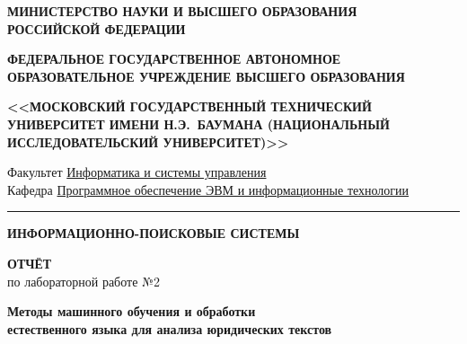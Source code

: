 \documentclass[12pt, a4paper]{report}
\begin{document}
\setcounter{chapter}{0}

\begin{titlepage}
\thispagestyle{empty}
\begin{center}

  {\sffamily\small\bfseries МИНИСТЕРСТВО НАУКИ И ВЫСШЕГО ОБРАЗОВАНИЯ\\
  РОССИЙСКОЙ ФЕДЕРАЦИИ}

  \vspace{6pt}
  {\sffamily\small\bfseries ФЕДЕРАЛЬНОЕ ГОСУДАРСТВЕННОЕ АВТОНОМНОЕ\\
  ОБРАЗОВАТЕЛЬНОЕ УЧРЕЖДЕНИЕ ВЫСШЕГО ОБРАЗОВАНИЯ}

  \vspace{8pt}
  {\sffamily\normalsize\bfseries
  <<МОСКОВСКИЙ ГОСУДАРСТВЕННЫЙ ТЕХНИЧЕСКИЙ УНИВЕРСИТЕТ ИМЕНИ Н.Э.~БАУМАНА (НАЦИОНАЛЬНЫЙ ИССЛЕДОВАТЕЛЬСКИЙ УНИВЕРСИТЕТ)>>}

  \vspace{6pt}
  {\sffamily\small Факультет \underline{Информатика и системы управления}}\\[2pt]
  {\sffamily\small Кафедра \underline{Программное обеспечение ЭВМ и информационные технологии}}

  \vspace{10pt}
  \textcolor{SteelBlue}{\rule{\linewidth}{1pt}}
  \vspace{12pt}

  {\sffamily\Large\bfseries\color{NavyBlue}
  ИНФОРМАЦИОННО-ПОИСКОВЫЕ СИСТЕМЫ}

  \vspace{20pt}

  {\sffamily\LARGE\bfseries ОТЧЁТ}\\[6pt]
  {\sffamily\large по лабораторной работе №2}

  \vspace{12pt}
  \begin{tcolorbox}[colback=LightBlue!50, colframe=NavyBlue,
    fonttitle=\sffamily\small\bfseries\color{NavyBlue}, boxrule=1pt,
    left=8pt, right=8pt, top=6pt, bottom=6pt, title={}]
    \centering\sffamily\large\bfseries\color{NavyBlue}
    Методы машинного обучения и обработки\\
    естественного языка для анализа юридических текстов
  \end{tcolorbox}

  \vspace{20pt}


\end{center}
\end{titlepage}
\end{document}
